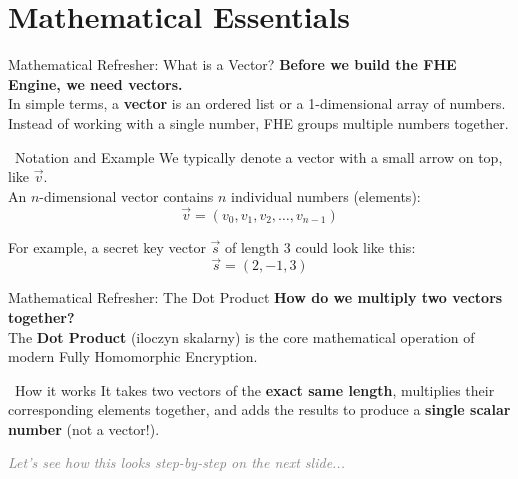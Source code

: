 \documentclass[aspectratio=169, 10pt]{beamer}
\begin{document}
\section{Mathematical Essentials}

\begin{frame}{Mathematical Refresher: What is a Vector?}
    \textbf{Before we build the FHE Engine, we need vectors.} \\
    \vspace{0.2cm}
    In simple terms, a \textbf{vector} is an ordered list or a 1-dimensional array of numbers. Instead of working with a single number, FHE groups multiple numbers together.
    \vspace{0.4cm}
    
    \begin{block}{\faListOl \ Notation and Example}
        We typically denote a vector with a small arrow on top, like $\vec{v}$. \\
        An $n$-dimensional vector contains $n$ individual numbers (elements):
        \[ \vec{v} = (v_0, v_1, v_2, \dots, v_{n-1}) \]
        
        For example, a secret key vector $\vec{s}$ of length 3 could look like this:
        \[ \vec{s} = (2, -1, 3) \]
    \end{block}
\end{frame}

\begin{frame}{Mathematical Refresher: The Dot Product}
    \Large
    \textbf{How do we multiply two vectors together?} \\
    \vspace{0.4cm}
    \normalsize
    The \textbf{Dot Product} (iloczyn skalarny) is the core mathematical operation of modern Fully Homomorphic Encryption.
    \vspace{0.4cm}
    
    \begin{block}{\faCalculator \ How it works}
        It takes two vectors of the \textbf{exact same length}, multiplies their corresponding elements together, and adds the results to produce a \textbf{single scalar number} (not a vector!).
    \end{block}
    \vspace{0.6cm}
    
    \begin{center}
        \textit{\textcolor{gray}{Let's see how this looks step-by-step on the next slide...}}
    \end{center}
\end{frame}
\end{document}
